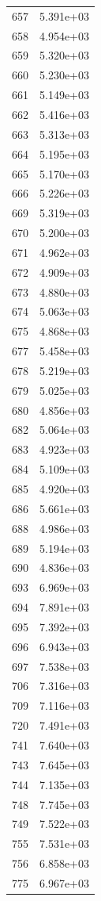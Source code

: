 \documentclass[12pt]{article}
\begin{document}
\begin{longtable}{@{}cc@{}}
657 & 5.391e+03 \\
658 & 4.954e+03 \\
659 & 5.320e+03 \\
660 & 5.230e+03 \\
661 & 5.149e+03 \\
662 & 5.416e+03 \\
663 & 5.313e+03 \\
664 & 5.195e+03 \\
665 & 5.170e+03 \\
666 & 5.226e+03 \\
669 & 5.319e+03 \\
670 & 5.200e+03 \\
671 & 4.962e+03 \\
672 & 4.909e+03 \\
673 & 4.880e+03 \\
674 & 5.063e+03 \\
675 & 4.868e+03 \\
677 & 5.458e+03 \\
678 & 5.219e+03 \\
679 & 5.025e+03 \\
680 & 4.856e+03 \\
682 & 5.064e+03 \\
683 & 4.923e+03 \\
684 & 5.109e+03 \\
685 & 4.920e+03 \\
686 & 5.661e+03 \\
688 & 4.986e+03 \\
689 & 5.194e+03 \\
690 & 4.836e+03 \\
693 & 6.969e+03 \\
694 & 7.891e+03 \\
695 & 7.392e+03 \\
696 & 6.943e+03 \\
697 & 7.538e+03 \\
706 & 7.316e+03 \\
709 & 7.116e+03 \\
720 & 7.491e+03 \\
741 & 7.640e+03 \\
743 & 7.645e+03 \\
744 & 7.135e+03 \\
748 & 7.745e+03 \\
749 & 7.522e+03 \\
755 & 7.531e+03 \\
756 & 6.858e+03 \\
775 & 6.967e+03 \\

\bottomrule
\end{longtable}
\end{document}
